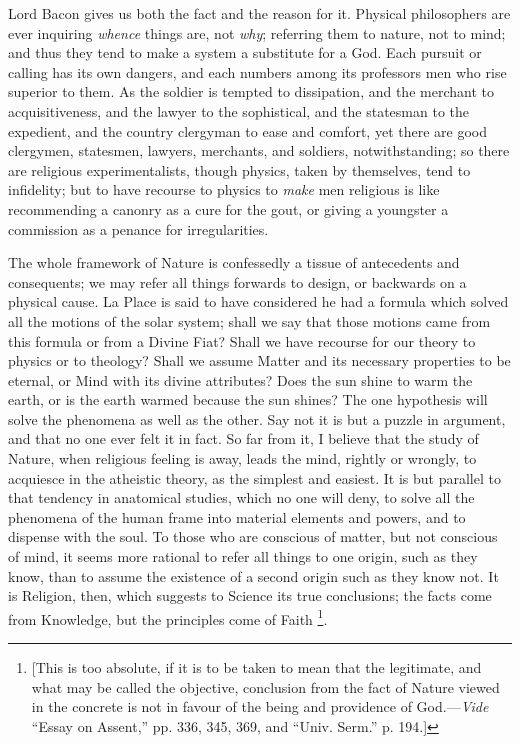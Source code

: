 Lord Bacon gives us both the fact and the reason for it. Physical
philosophers are ever inquiring \emph{whence} things are, not \emph{why};
referring them to nature, not to mind; and thus they tend to make a
system a substitute for a God. Each pursuit or calling has its own
dangers, and each numbers among its professors men who rise superior
to them. As the soldier is tempted to dissipation, and the merchant to
acquisitiveness, and the lawyer to the sophistical, and the statesman
to the expedient, and the country clergyman to ease and comfort, yet
there are good clergymen, statesmen, lawyers, merchants, and soldiers,
notwithstanding; so there are religious experimentalists, though
physics, taken by themselves, tend to infidelity; but to have recourse
to physics to \emph{make} men religious is like recommending a canonry
as a cure for the gout, or giving a youngster a commission as a
penance for irregularities.

The whole framework of Nature is confessedly a tissue of
antecedents and consequents; we may refer all things forwards to
design, or backwards on a physical cause. La Place is said to have
considered he had a formula which solved all the motions of the solar
system; shall we say that those motions came from this formula or from
a Divine Fiat? Shall we have recourse for our theory to physics or to
theology? Shall we assume Matter and its necessary properties to
be eternal, or Mind with its divine attributes? Does the sun shine to
warm the earth, or is the earth warmed because the sun shines? The one
hypothesis will solve the phenomena as well as the other. Say not it
is but a puzzle in argument, and that no one ever felt it in fact. So
far from it, I believe that the study of Nature, when religious
feeling is away, leads the mind, rightly or wrongly, to acquiesce in
the atheistic theory, as the simplest and easiest. It is but parallel
to that tendency in anatomical studies, which no one will deny, to
solve all the phenomena of the human frame into material elements and
powers, and to dispense with the soul. To those who are conscious of
matter, but not conscious of mind, it seems more rational to refer all
things to one origin, such as they know, than to assume the existence
of a second origin such as they know not. It is Religion, then, which
suggests to Science its true conclusions; the facts come from
Knowledge, but the principles come of Faith \footnote{[This is too absolute, if it is to be taken to mean that the
legitimate, and what may be called the objective, conclusion from the
fact of Nature viewed in the concrete is not in favour of the being
and providence of God.—\emph{Vide} ``Essay on Assent,'' pp.
336, 345, 369, and ``Univ. Serm.'' p. 194.]}.

